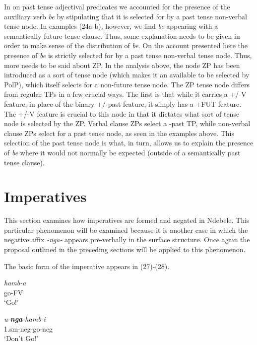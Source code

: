 \documentclass[output=paper]{langsci/langscibook}
\newcommand{\nga}[0]{\textit {-nga- }}
\newcommand{\bee}[0]{\textit {be }}
\begin{document}
In  on past tense adjectival predicates we accounted for the presence of the auxiliary verb \bee by stipulating that it is selected for by a past tense non-verbal tense node. In  examples (24a-b), however, we find \bee appearing with a semantically future tense clause. Thus, some explanation needs to be given in order to make sense of the distribution of \textit{be}. On the account presented here the presence of \bee is strictly selected for by a past tense non-verbal tense node. Thus, more needs to be said about ZP.
In the analysis above, the node ZP has been introduced as a sort of tense node (which makes it an available to be selected by PolP), which itself selects for a non-future tense node. The ZP tense node differs from regular TPs in a few crucial ways. The first is that while it carries a +/-V feature, in place of the binary +/-past feature, it simply has a +FUT feature. The +/-V feature is crucial to this node in that it dictates what sort of tense node is selected by the ZP. Verbal clause ZPs select a -past TP, while non-verbal clause ZPs select for a past tense node, as seen in the examples above. This selection of the past tense node is what, in turn, allows us to explain the presence of \bee where it would not normally be expected (outside of a semantically past tense clause). 


























\section{Imperatives}

This section examines how imperatives are formed and negated in Ndebele. This particular phenomenon will be examined because it is another case in which the negative affix \nga appears pre-verbally in the surface structure. Once again the proposal outlined in the preceding sections will be applied to this phenomenon.

The basic form of the imperative appears in (27)-(28).


\begin{exe}
\ex \begin{xlist}
\ex \gll \textit{hamb-a}\\
        go-FV\\
    \glt `Go!'

\ex \gll \textit{u-\textbf{nga}-hamb-i}\\
        1.{\sc sm}-{\sc neg}-go-{\sc neg}\\
    \glt `Don't Go!'
\end{xlist}
\end{exe}
\end{document}
